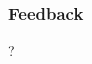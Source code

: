 \documentclass[german,aspectratio=169,notoc,titlestyle=tud,draft]{tudbeamer}%
\begin{document}
		    
			

\begin{backmatterframe}
	\frametitle*{Feedback}
	\centering\Huge ? 
\end{backmatterframe}

\end{document}
